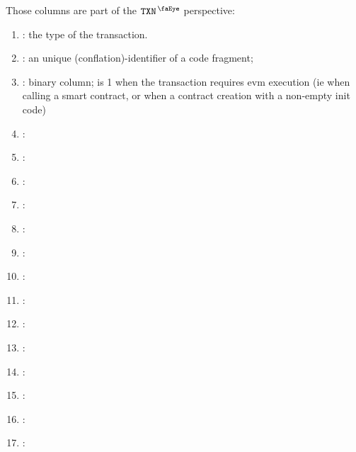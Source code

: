 Those columns are part of the $\isTxn$ perspective:
\begin{enumerate}[resume]
    \item \txType{}:
    the type of the transaction.
    \item \CFI{}: 
    an unique (conflation)-identifier of a code fragment;
    \item \txRequiresEvmExecution{}:
    binary column; is 1 when the transaction requires evm execution (ie when calling a smart contract, or when a contract creation with a non-empty init code)
    \item \isDep{}:
    \item \chainId{}:
    \item \nonce{}:
    \item \gasPrice{}: 
    \item \phaseMaxPriorityFeePerGas{}: 
    \item \maxFeePerGas{}: 
    \item \gasLimit{}: 
    \item \toHi{}:
    \item \toLo{}: 
    \item \txnValue{}: 
    \item \dataSize{}:
    \item \dataCost{}:
    \item \nbWarmedAddress{}:
    \item \nbWarmedStorageKey{}:  
\end{enumerate}
